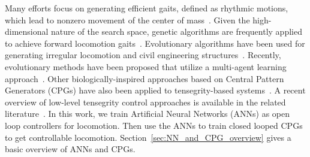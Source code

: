 Many efforts focus on generating efficient gaits, defined as rhythmic
motions, which lead to nonzero movement of the center of
mass~\cite{McIsaac:2003kl}.  Given the high-dimensional nature of the
search space, genetic algorithms are frequently applied to achieve
forward locomotion gaits~\cite{Paul2006a}. Evolutionary algorithms
have been used for generating irregular locomotion and civil
engineering structures~\cite{Rieffel2009Automated-Disco,
veuve2015deployment}. Recently, evolutionary methods have been
proposed that utilize a multi-agent learning
approach~\cite{Iscen2013Controlling-Ten}.  Other biologically-inspired
approaches based on Central Pattern Generators (CPGs) have also
been applied to tensegrity-based
systems~\cite{Bliss2013Central-Pattern, MirletzSoftRobotics,
Caluwaerts2013rsif}. 
A recent overview of low-level tensegrity
control approaches is available in the related literature~\cite[Table
2]{Caluwaerts2013rsif}. 
In this work, we train Artificial Neural Networks (ANNs) as open loop controllers for locomotion.
Then use the ANNs to train closed looped CPGs to get controllable locomotion.
Section~\ref{sec:NN_and_CPG_overview} gives a basic overview of ANNs and CPGs.




